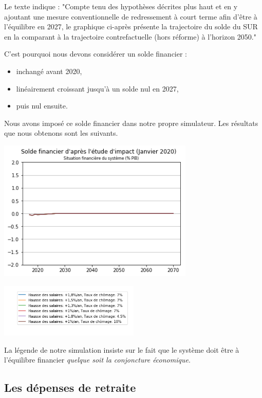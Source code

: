 \documentclass[10pt]{article}
\begin{document}
Le texte indique : "Compte tenu des hypothèses décrites plus haut 
et en y ajoutant une mesure conventionnelle de redressement à court 
terme afin d’être à l’équilibre en 2027, le graphique ci-après présente 
la trajectoire du solde du SUR en la comparant à la trajectoire 
contrefactuelle (hors réforme) à l’horizon 2050."

C'est pourquoi nous devons considérer un solde financier :
\begin{itemize}
\item inchangé avant 2020,
\item linéairement croissant jusqu'à un solde nul en 2027,
\item puis nul ensuite.
\end{itemize}

Nous avons imposé ce solde financier dans notre propre simulateur. 
Les résultats que nous obtenons sont les suivants. 

\begin{center}
\includegraphics[width=0.7\textwidth]{Simulation-Solde-Financier.png}

\includegraphics[width=0.5\textwidth]{Simulation-legende.png}
\end{center}

La légende de notre simulation insiste sur le fait que 
le système doit être à l'équilibre financier \emph{quelque soit la 
conjoncture économique}. 


\subsection{Les dépenses de retraite}
\end{document}
